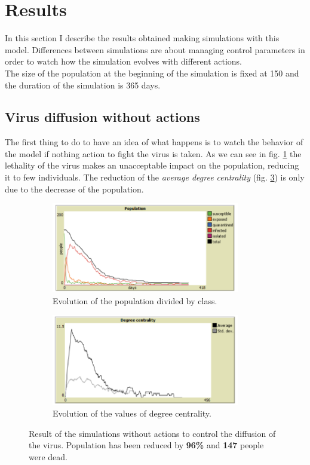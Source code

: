 \documentclass[12pt]{llncs}
\begin{document}
\section{Results}\label{results}
In this section I describe the results obtained making simulations with this model. Differences between simulations are about managing control parameters in order to watch how the simulation evolves with different actions.\\
The size of the population at the beginning of the simulation is fixed at 150 and the duration of the simulation is 365 days.

\subsection{Virus diffusion without actions}
The first thing to do to have an idea of what happens is to watch the behavior of the model if nothing action to fight the virus is taken. As we can see in fig. \ref{fig:noactions-a} the lethality of the virus makes an unacceptable impact on the population, reducing it to few individuals. The reduction of the \textit{average degree centrality} (fig. \ref{fig:noactions-b}) is only due to the decrease of the population.

\begin{figure}
	\begin{subfigure}{\textwidth}
	\centering
		\includegraphics[width=0.9\textwidth]{results/no_actions_population.png}
		\caption{Evolution of the population divided by class.} \label{fig:noactions-a}
	\end{subfigure}
	\begin{subfigure}{\textwidth}
	\centering
		\includegraphics[width=0.9\textwidth]{results/no_actions_degree_centrality.png}
		\caption{Evolution of the values of degree centrality.} \label{fig:noactions-b}
	\end{subfigure}
	\caption{Result of the simulations without actions to control the diffusion of the virus. Population has been reduced by \textbf{96\%} and \textbf{147} people were dead.}
\end{figure}
\end{document}
